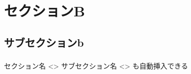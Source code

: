\section{セクションB}
\subsection{サブセクションb}
\begin{frame}{}
  \frametitle{\insertsubsection}
  セクション名
  <\insertsection>
  サブセクション名
  <\insertsubsection>
  も自動挿入できる
\end{frame}
